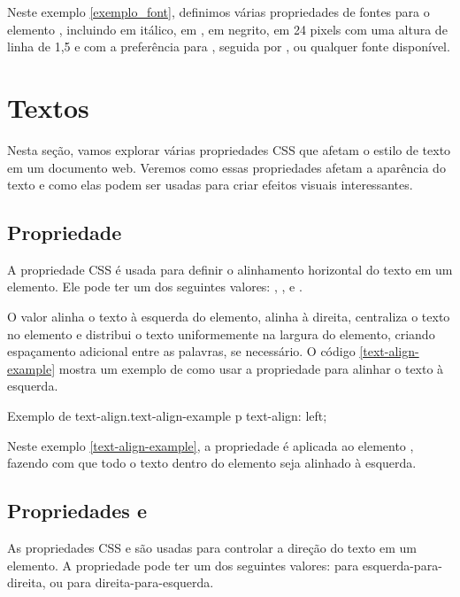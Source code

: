 Neste exemplo \ref{exemplo_font}, definimos várias propriedades de fontes para o elemento , incluindo  em itálico,  em ,  em negrito,  em 24 pixels com uma altura de linha de 1,5 e  com a preferência para , seguida por ,  ou qualquer fonte  disponível.

\section{Textos}

Nesta seção, vamos explorar várias propriedades CSS que afetam o estilo de texto em um documento web. Veremos como essas propriedades afetam a aparência do texto e como elas podem ser usadas para criar efeitos visuais interessantes.

\subsection{Propriedade }

A propriedade CSS  é usada para definir o alinhamento horizontal do texto em um elemento. Ele pode ter um dos seguintes valores: , ,  e .

O valor  alinha o texto à esquerda do elemento,  alinha à direita,  centraliza o texto no elemento e  distribui o texto uniformemente na largura do elemento, criando espaçamento adicional entre as palavras, se necessário. O código \ref{text-align-example} mostra um exemplo de como usar a propriedade  para alinhar o texto à esquerda.

\begin{csscode}{Exemplo de text-align.}{text-align-example}
p {
    text-align: left;
}
\end{csscode}

Neste exemplo \ref{text-align-example}, a propriedade  é aplicada ao elemento , fazendo com que todo o texto dentro do elemento seja alinhado à esquerda.

\subsection{Propriedades  e }

As propriedades CSS  e  são usadas para controlar a direção do texto em um elemento. A propriedade  pode ter um dos seguintes valores:  para esquerda-para-direita, ou  para direita-para-esquerda.

